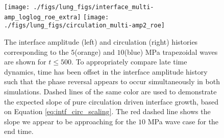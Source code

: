 %
\begin{figure}[h] 
  \centering
  \texttt{[image: ./figs/lung\_figs/interface\_multi-amp\_loglog\_roe\_extra]}
  \texttt{[image: ./figs/lung\_figs/circulation\_multi-amp2\_roe]}
  \caption[The interface and circulation dependence on wave amplitude
  at long time]{The interface amplitude (left) and circulation (right)
    histories corresponding to the $5$(orange) and $10$(blue) MPa
    trapezoidal waves are shown for $t\leq 500$. To appropriately
    compare late time dynamics, time has been offset in the interface
    amplitude history such that the phase reversal appears to occur
    simultaneously in both simulations. Dashed lines of the same color
    are used to demonstrate the expected slope of pure circulation
    driven interface growth, based on Equation
    \eqref{eq:intf_circ_scaling}. The red dashed line shows the slope we
    appear to be approaching for the $10$ MPa wave case for the end time.}
  \label{fig:trapz_circ_interface_loglog}
\end{figure}
%
